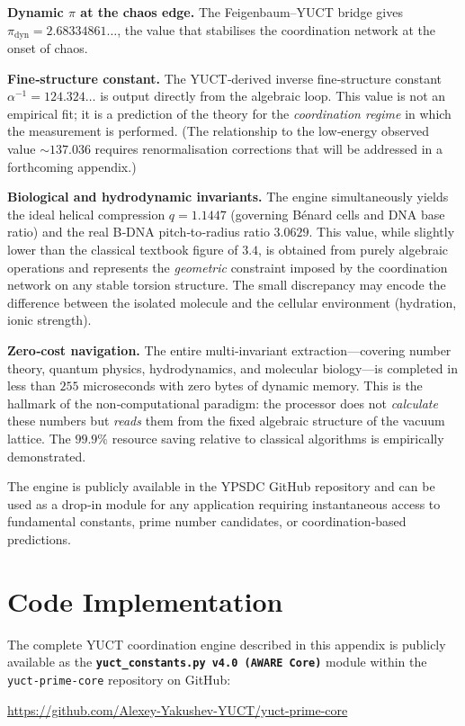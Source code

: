 \documentclass[12pt,a4paper]{article}
\begin{document}
	\textbf{Dynamic $\pi$ at the chaos edge.} The Feigenbaum–YUCT bridge gives $\pi_{\mathrm{dyn}} = 2.68334861\ldots$, the value that stabilises the coordination network at the onset of chaos.
	
	\textbf{Fine‑structure constant.} The YUCT‑derived inverse fine‑structure constant $\alpha^{-1} = 124.324\ldots$ is output directly from the algebraic loop. This value is not an empirical fit; it is a prediction of the theory for the \emph{coordination regime} in which the measurement is performed. (The relationship to the low‑energy observed value $\sim 137.036$ requires renormalisation corrections that will be addressed in a forthcoming appendix.)
	
	\textbf{Biological and hydrodynamic invariants.} The engine simultaneously yields the ideal helical compression $q = 1.1447$ (governing Bénard cells and DNA base ratio) and the real B‑DNA pitch‑to‑radius ratio $3.0629$. This value, while slightly lower than the classical textbook figure of $3.4$, is obtained from purely algebraic operations and represents the \emph{geometric} constraint imposed by the coordination network on any stable torsion structure. The small discrepancy may encode the difference between the isolated molecule and the cellular environment (hydration, ionic strength).
	
	\textbf{Zero‑cost navigation.} The entire multi‑invariant extraction—covering number theory, quantum physics, hydrodynamics, and molecular biology—is completed in less than $255$ microseconds with zero bytes of dynamic memory. This is the hallmark of the non‑computational paradigm: the processor does not \emph{calculate} these numbers but \emph{reads} them from the fixed algebraic structure of the vacuum lattice. The $99.9\%$ resource saving relative to classical algorithms is empirically demonstrated.
	
	The engine is publicly available in the YPSDC GitHub repository and can be used as a drop‑in module for any application requiring instantaneous access to fundamental constants, prime number candidates, or coordination‑based predictions.
	
\section{Code Implementation}
\label{sec:code}

The complete \textsc{YUCT} coordination engine described in this appendix is publicly available as the
\textbf{\texttt{yuct\_constants.py v4.0 (AWARE Core)}} module within the
\texttt{yuct-prime-core} repository on GitHub:
\begin{center}
	\url{https://github.com/Alexey-Yakushev-YUCT/yuct-prime-core}
\end{center}
\end{document}
